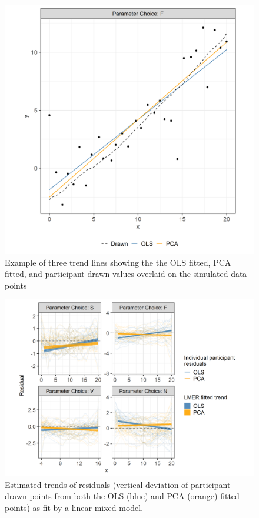 \documentclass[10pt]{article}
\begin{document}
\begin{figure}[ht]
\begin{center}
\centerline{\includegraphics[width=\columnwidth]{images/eyefitting-trial-plot}}
\caption{Example of three trend lines showing the the OLS fitted, PCA fitted, and participant drawn values overlaid on the simulated data points}
\label{eyefitting-trial-plot}
\end{center}
\end{figure}

\begin{figure}[ht]
\begin{center}
\centerline{\includegraphics[width=\columnwidth]{images/eyefitting-lmer-plot}}
\caption{Estimated trends of residuals (vertical deviation of participant drawn points from both the OLS (blue) and PCA (orange) fitted points) as fit by a linear mixed model.}
\label{eyefitting-lmer-plot}
\end{center}
\end{figure}
\end{document}
